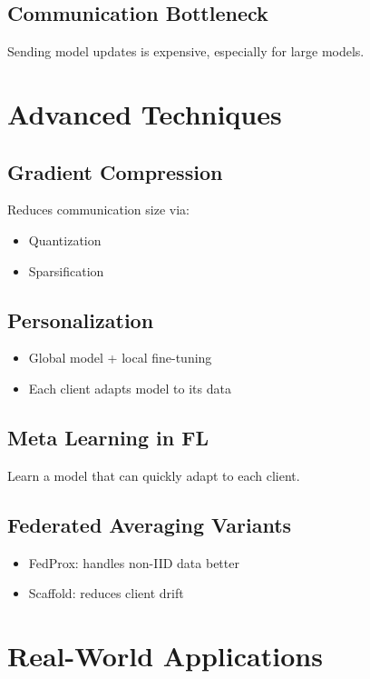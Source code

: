 \documentclass[12pt]{article}
\begin{document}
\subsection{Communication Bottleneck}
Sending model updates is expensive, especially for large models.

\section{Advanced Techniques}
\label{sec:advanced}

\subsection{Gradient Compression}
Reduces communication size via:
\begin{itemize}
    \item Quantization
    \item Sparsification
\end{itemize}

\subsection{Personalization}
\begin{itemize}
    \item Global model + local fine-tuning
    \item Each client adapts model to its data
\end{itemize}

\subsection{Meta Learning in FL}
Learn a model that can quickly adapt to each client.

\subsection{Federated Averaging Variants}
\begin{itemize}
    \item FedProx: handles non-IID data better
    \item Scaffold: reduces client drift
\end{itemize}

\section{Real-World Applications}
\label{sec:applications}
\end{document}
